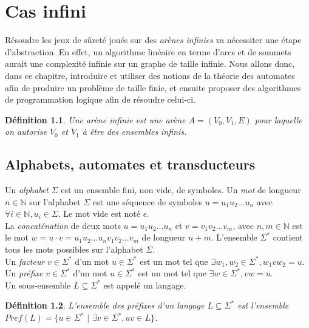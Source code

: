 \documentclass[12pt,a4paper,oneside,titlepage]{report}
\newtheorem{defi}{D\'efinition}[section]
\begin{document}
\chapter{Cas infini}
Résoudre les jeux de sûreté joués sur des \emph{arènes infinies} va nécessiter une étape d'abstraction. En effet, un algorithme linéaire en terme d'arcs et de sommets aurait une complexité infinie sur un graphe de taille infinie. Nous allons donc, dans ce chapitre, introduire et utiliser des notions de la théorie des automates afin de produire un problème de taille finie, et ensuite proposer des algorithmes de programmation logique afin de résoudre celui-ci.
\begin{defi}
Une \emph{arène infinie} est une arène $A=(V_0, V_1, E)$ pour laquelle on autorise $V_0$ et $V_1$ à être des ensembles infinis.
\end{defi}

\section{Alphabets, automates et transducteurs}
Un \emph{alphabet} $\Sigma$ est un ensemble fini, non vide, de symboles. Un \emph{mot} de longueur $n\in\mathbb{N}$ sur l'alphabet $\Sigma$ est une séquence de symboles $u=u_1u_2...u_n$ avec $\forall i\in\mathbb{N}, u_i\in \Sigma$. Le mot vide est noté $\epsilon$.\\
La \emph{concaténation} de deux mots $u=u_1u_2...u_n$ et $v=v_1v_2...v_m$, avec $n,m\in\mathbb{N}$ est le mot $w=u\cdot v=u_1u_2...u_nv_1v_2...v_m$ de longueur $n+m$. L'ensemble $\Sigma^*$ contient tous les mots possibles sur l'alphabet $\Sigma$.\\
Un \emph{facteur} $v\in\Sigma^*$ d'un mot $u\in\Sigma^*$ est un mot tel que $\exists w_1,w_2\in\Sigma^*,w_1vw_2=u$.\\
Un \emph{préfixe} $v\in\Sigma^*$ d'un mot $u\in\Sigma^*$ est un mot tel que $\exists w\in\Sigma^*, vw=u$.\\
Un sous-ensemble $L\subseteq \Sigma^*$ est appelé un langage.
\begin{defi}
L'ensemble des préfixes d'un langage $L\subseteq\Sigma^*$ est l'ensemble $Pref(L)=\{u\in\Sigma^*$ $|$ $\exists v\in\Sigma^*, uv\in L\}$.
\end{defi}
\end{document}
